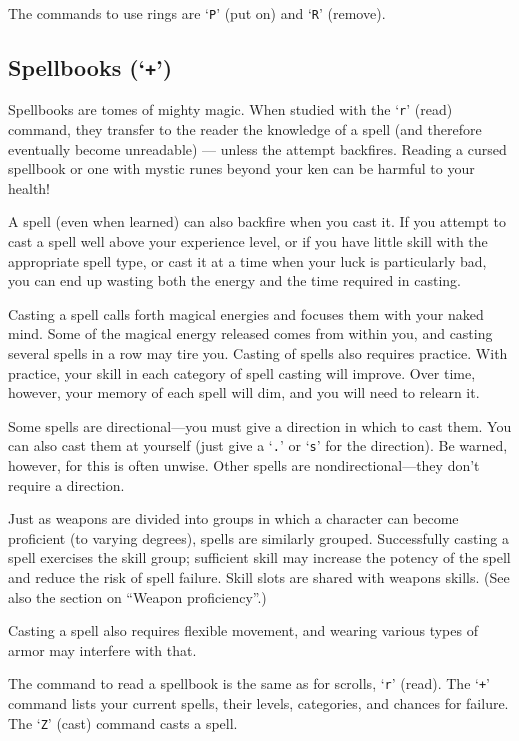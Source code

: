 The commands to use rings are `{\tt P}' (put on) and `{\tt R}' (remove).

\subsection*{Spellbooks (`{\tt +}')}

Spellbooks are tomes of mighty magic.  When studied with the `{\tt r}' (read)
command, they transfer to the reader the knowledge of a spell (and
therefore eventually become unreadable) --- unless the attempt backfires.
Reading a cursed spellbook or one with mystic runes beyond
your ken can be harmful to your health!

A spell (even when learned) can also backfire when you cast it.  If you
attempt to cast a spell well above your experience level, or if you have
little skill with the appropriate spell type, or cast it at
a time when your luck is particularly bad, you can end up wasting both the
energy and the time required in casting.

Casting a spell calls forth magical energies and focuses them with
your naked mind.  Some of the magical energy released comes from within
you, and casting several spells in a row may tire you.
Casting of spells also requires practice.  With practice, your
skill in each category of spell casting will improve.  Over time, however,
your memory of each spell will dim, and you will need to relearn it.

Some spells are
directional---you must give a direction in which to cast them.  You can also
cast them at yourself (just give a `{\tt .}' or `{\tt s}' for the direction).
Be warned, however, for this is often unwise.  Other spells are
nondirectional---they don't require a direction.

Just as weapons are divided into groups in which a character can become
proficient (to varying degrees), spells are similarly grouped.
Successfully casting a spell exercises the skill group; sufficient skill
may increase the potency of the spell and reduce the risk of spell failure.
Skill slots are shared with weapons skills.  (See also the section on
``Weapon proficiency''.)

Casting a spell also requires flexible movement, and wearing various types
of armor may interfere with that.

The command to read a spellbook is the same as for scrolls, `{\tt r}'
(read).  The `{\tt +}' command lists your current spells, their levels,
categories, and chances for failure.
The `{\tt Z}' (cast) command casts a spell.

